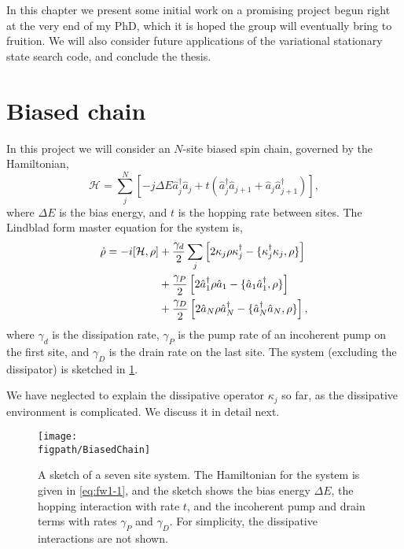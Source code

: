 In this chapter we present some initial work on a promising project begun right at the very end of my PhD, which it is hoped the group will eventually bring to fruition. We will also consider future applications of the variational stationary state search code, and conclude the thesis.

\section{Biased chain}
In this project we will consider an \(N\)-site biased spin chain, governed by the Hamiltonian,
\begin{equation}
	\mathcal{H} = \sum_{j}^{N}\left[ -j \Delta E \hat{a}_{j}^{\dagger}\hat{a}_{j} + t\left( \hat{a}_{j}^{\dagger}\hat{a}_{j+1} + \hat{a}_{j}\hat{a}_{j+1}^{\dagger}\right)\right],
	\label{eq:fw1-1}
\end{equation}
where \(\Delta E\) is the bias energy, and \(t\) is the hopping rate between sites. The Lindblad form master equation for the system is, 
\begin{align}
	\dot{\rho} = -i[\mathcal{H}, \rho] &+ \frac{\gamma_{d}}{2} \sum_{j} \left[2\kappa_{j}\rho\kappa_{j}^{\dagger} - \{\kappa_{j}^{\dagger}\kappa_{j}, \rho\}\right] \notag \\
	&+ \frac{\gamma_{P}}{2}\left[2\hat{a}_{1}^{\dagger}\rho\hat{a}_{1} - \{\hat{a}_{1}\hat{a}_{1}^{\dagger}, \rho\}\right] \notag \\
	&+ \frac{\gamma_{D}}{2}\left[2\hat{a}_{N}\rho\hat{a}_{N}^{\dagger} - \{\hat{a}_{N}^{\dagger}\hat{a}_{N}, \rho\}\right],
	\label{eq:fw1-2}
\end{align}
where \(\gamma_{d}\) is the dissipation rate, \(\gamma_{P}\) is the pump rate of an incoherent pump on the first site, and \(\gamma_{D}\) is the drain rate on the last site. The system (excluding the dissipator) is sketched in \cref{fig:fw1-1}.

We have neglected to explain the dissipative operator \(\kappa_{j}\) so far, as the dissipative environment is complicated. We discuss it in detail next.

\begin{figure}[ht!]
	\centering
	\texttt{[image: \\figpath/BiasedChain]}
	\caption{\label{fig:fw1-1}A sketch of a seven site system. The Hamiltonian for the system is given in \cref{eq:fw1-1}, and the sketch shows the bias energy \(\Delta E\), the hopping interaction with rate \(t\), and the incoherent pump and drain terms with rates \(\gamma_{P}\) and \(\gamma_{D}\). For simplicity, the dissipative interactions are not shown.}
\end{figure}

